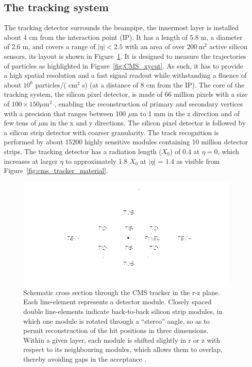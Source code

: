 \subsection{The tracking system}
The tracking detector surrounds the beampipe, the innermost layer is installed
about 4 cm from the interaction point (IP). It has a length of 5.8 m, a diameter of 2.6 m,
and covers a range of $|\eta| < 2.5$ with an area of over $200~\mathrm{m}^{2}$ active silicon sensors, its
layout is shown in Figure~\ref{fig:cms_tracker_layout}. It is
designed to measure the trajectories of particles as highlighted in Figure~\ref{fig:CMS_xycut}. As such,
it has to provide a high spatial resolution and a fast signal readout while withstanding a fluence
of about $10^6$ particles/( cm$^2$ s) (at a distance of 8 cm from
the IP).
The core of the tracking system, the silicon pixel detector, is made of 66 million pixels
with a size of $100 \times 150 \mu$m$^2$ , enabling the reconstruction of primary and secondary
vertices with a precision that ranges between 100 $\mu$m to 1 mm in the z direction and of few tens of $\mu$m
in the x and y directions. The silicon pixel detector is followed by a silicon strip detector with coarser
granularity. The track recognition is performed by about 15200 highly sensitive
modules containing 10 million detector strips. The tracking detector has a radiation length ($X_0$) of 0.4 at $\eta = 0$,
which increases at larger $\eta$ to approximately 1.8 $X_0$ at $|\eta|$ = 1.4 as visible from Figure~\ref{fig:cms_tracker_material}.

\begin{figure}[h]
  \centering
  \includegraphics[width = 1.\textwidth]{figures/cms/trackerLayout.png}
  \caption{Schematic cross section through the CMS tracker in the r-z plane. Each line-element represents a detector module.
    Closely spaced double line-elements indicate back-to-back silicon strip modules,
    in which one module is rotated through a ``stereo'' angle, so as to permit reconstruction of the hit positions in
    three dimensions. Within a given layer, each module is shifted slightly in r or z with respect to its neighbouring modules,
    which allows them to overlap, thereby avoiding gaps in the acceptance \cite{cms_trk}.}
  \label{fig:cms_tracker_layout}
\end{figure}

